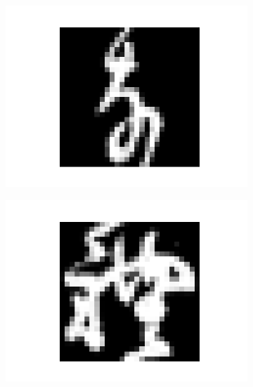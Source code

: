 \documentclass[14pt,a4paper]{extarticle}
\begin{document}
\begin{figure}[htb]
\begin{subfigure}[b]{0.3\textwidth}
    \includegraphics[width=\textwidth]{../res/kmnist/sample_6.png}
    \label{fig:kmnist_sample_6}
  \end{subfigure}
  \hfill
  \begin{subfigure}[b]{0.3\textwidth}
    \includegraphics[width=\textwidth]{../res/kmnist/sample_7.png}
    \label{fig:kmnist_sample_7}
  \end{subfigure}
  \hfill
  \begin{subfigure}[b]{0.3\textwidth}

\end{subfigure}
\end{figure}
\end{document}
